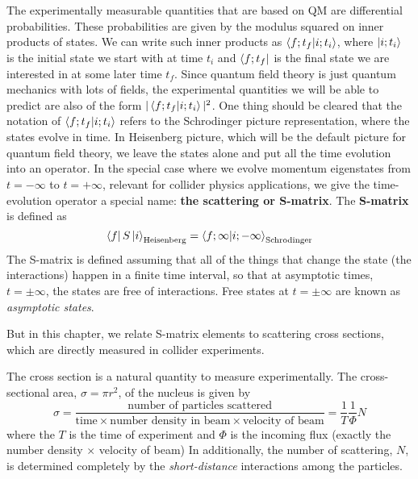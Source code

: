 \documentclass[12pt,openany]{book}
\begin{document}
	\par 
	The experimentally measurable quantities that are based on QM are differential probabilities. 
	These probabilities are given by the modulus squared on inner products of states. We can write such inner products as $\braket{f;t_f|i;t_i}$, where $\ket{i;t_i}$  is the initial state we start with at time $t_i$ and $\bra{f;t_f}$ is the final state we are interested in at some later time $t_f$. Since quantum field theory is just quantum mechanics with lots of fields, the experimental quantities we will be 
	able to predict are also of the form $|\braket{f;t_f|i;t_i
	}|^2$. One thing should be cleared that the notation of $\braket{f;t_f|i;t_i}$ refers to the Schrodinger picture representation, where the states evolve in time. In Heisenberg picture, which will be the default picture for quantum field theory, we leave the states alone and put all the time evolution into an operator. In the special case where we evolve momentum eigenstates from $t=-\infty$ to $t=+\infty$, relevant for collider physics applications, we give the time-evolution operator a special name: \textbf{the scattering or S-matrix}. The \textbf{S-matrix} is defined as
	\begin{equation}
		\bra{f}S\ket{i}_{\text{Heisenberg}}=\braket{f;\infty|i;-\infty}_{\text{Schrodinger}}
	\end{equation}
	The S-matrix is defined assuming that all of the things that change the state (the interactions) happen in a finite time interval, so that at asymptotic times, $t=\pm\infty$, the states are free of interactions. Free states at $t=\pm\infty$ are known as \textit{asymptotic states}.\par 
	But in this chapter, we relate S-matrix elements to scattering cross sections, which are directly measured in collider experiments. \par 
	The cross section is a natural quantity to measure 
	experimentally. The  cross-sectional area, $\sigma=\pi r^2$, of the nucleus is given by 
	\begin{equation}
		\sigma=\frac{\text{number of particles scattered}}{\text{time}\times\text{number density in beam}\times\text{velocity of beam}}=\frac{1}{T}\frac{1}{\Phi}N
	\end{equation}
	where the $T$ is the time of experiment and $\Phi$ is the incoming flux (exactly the number density $\times$ velocity of beam)
	In additionally, the number of scattering, $N$, is determined completely by the \textit{short-distance} interactions among the 
	particles.\par 
\end{document}
